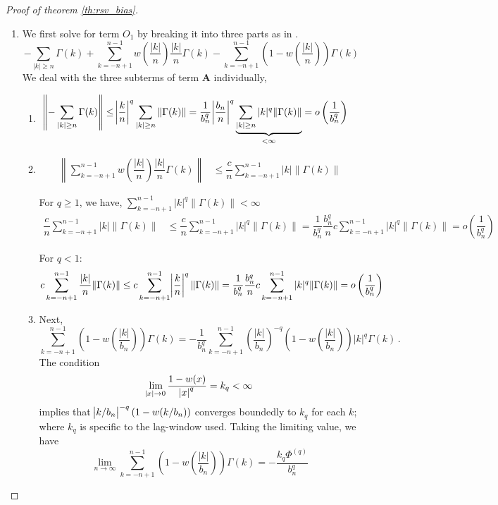 \documentclass[12pt]{article}
\theoremstyle{remark}
\begin{document}
\begin{proof}[Proof of theorem \ref{th:rsv_bias}]
\begin{enumerate}
\item We first solve for term $O_1$ by breaking it into three parts as in \cite{hannan2009multiple}.
\[
-\sum_{|k|\geq n}\Gamma(k) + \sum_{k = -n+1}^{n-1}w\left(\dfrac{|k|}{n}\right)\dfrac{|k|}{n}\Gamma(k)- \sum_{k = -n+1}^{n-1}\left(1-w\left(\dfrac{|k|}{n}\right)\right)\Gamma(k)
\]
%
We deal with the three subterms of term \textbf{A} individually,
\begin{enumerate}
    \item 
    \begin{align*}
        \left\|{-\sum_{|k|\geq n}\Gamma(k)}\right\| &\leq   \abs{\dfrac{k}{n}}^q\sum_{|k|\geq n}\|\Gamma(k)\| = \dfrac{1}{b_n^q}\abs{\dfrac{b_n}{n}}^q\underbrace{\sum_{|k|\geq n}|k|^q\|\Gamma(k)\|}_{<\infty} = o\left(\dfrac{1}{b_n^q}\right)
    \end{align*}
    
    \item
\begin{align*}
   \left\| \sum_{k = -n+1}^{n-1}w\left(\dfrac{|k|}{n}\right)\dfrac{|k|}{n}\Gamma(k)\right\| &\leq \dfrac{c}{n}\sum_{k = -n+1}^{n-1}|k|\|\Gamma(k)\| 
\end{align*}
 
For $q \geq 1$, we have, $\sum_{k=-n+1}^{n-1}|k|^q\|\Gamma(k)\| < \infty$
   \begin{align*}
       \dfrac{c}{n}\sum_{k = -n+1}^{n-1}|k|\|\Gamma(k)\| &\leq \dfrac{c}{n}\sum_{k = -n+1}^{n-1}|k|^q\|\Gamma(k)\| = \dfrac{1}{b_n^q}\dfrac{b_n^q}{n}c\sum_{k = -n+1}^{n-1}|k|^q\|\Gamma(k)\| = o\left(\dfrac{1}{b_n^q}\right) 
   \end{align*}
          
For $q <1$:
   \begin{align*}
       c\sum_{k =-n+1}^{n-1}\dfrac{|k|}{n}\|\Gamma(k)\| &\leq c\sum_{k =-n+1}^{n-1}\abs{\dfrac{k}{n}}^q\|\Gamma(k)\| = \dfrac{1}{b_n^q}\dfrac{b_n^q}{n}c\sum_{k =-n+1}^{n-1}|k|^q\|\Gamma(k)\| = o\left(\dfrac{1}{b_n^q}\right) 
   \end{align*}

  \item Next,
     \[
     \sum_{k = -n+1}^{n-1}\left(1-w\left(\dfrac{|k|}{b_n}\right)\right)\Gamma(k) = -\dfrac{1}{b_n^q}\sum_{k = -n+1}^{n-1}  \left(\dfrac{|k|}{b_n}\right)^{-q} {\left(1-w\left(\dfrac{|k|}{b_n}\right)\right)}|k|^q \Gamma(k)\,.
     \]
%     
     The condition 
     \[
     \lim_{\abs{x}\to 0}\dfrac{1 - w(x)}{\abs{x}^q} = k_q < \infty
     \]
     implies that $\abs{k/b_n}^{-q}(1-w(k/b_n))$ converges boundedly to $k_q$ for each $k$; where $k_q$ is specific to the lag-window used. Taking the limiting value, we have
     \[
     \lim_{n \to \infty}\sum_{k = -n+1}^{n-1}\left(1-w\left(\dfrac{|k|}{b_n}\right)\right)\Gamma(k) = -\dfrac{k_q \Phi^{(q)}}{b_n^q}
     \]
\end{enumerate}


\end{enumerate}
\end{proof}
\end{document}
